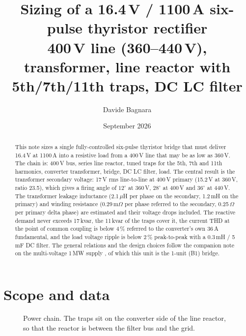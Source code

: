 \documentclass[11pt,a4paper]{article}
\title{Sizing of a 16.4\,V / 1100\,A six-pulse thyristor rectifier\\
\large 400\,V line (360--440\,V), transformer, line reactor with 5th/7th/11th traps, DC LC filter}
\author{Davide Bagnara}
\date{September 2026}
\begin{document}
\maketitle

\begin{abstract}
This note sizes a single fully-controlled six-pulse thyristor bridge that must deliver 16.4\,V at 1100\,A into a resistive load from a 400\,V line that may be as low as 360\,V. The chain is: 400\,V bus, series line reactor, tuned traps for the 5th, 7th and 11th harmonics, converter transformer, bridge, DC LC filter, load. The central result is the transformer secondary voltage: 17\,V rms line-to-line at 400\,V primary (15.2\,V at 360\,V, ratio 23.5), which gives a firing angle of $12^\circ$ at 360\,V, $28^\circ$ at 400\,V and $36^\circ$ at 440\,V. The transformer leakage inductance (2.1\,$\mu$H per phase on the secondary, 1.2\,mH on the primary) and winding resistance (0.29\,m$\Omega$ per phase referred to the secondary, 0.25\,$\Omega$ per primary delta phase) are estimated and their voltage drops included. The reactive demand never exceeds 17\,kvar, the 11\,kvar of the traps cover it, the current THD at the point of common coupling is below 4\,\% referred to the converter's own 36\,A fundamental, and the load voltage ripple is below 2\,\% peak-to-peak with a 0.3\,mH / 5\,mF DC filter. The general relations and the design choices follow the companion note on the multi-voltage 1\,MW supply \cite{acdc}, of which this unit is the 1-unit (B1) bridge.
\end{abstract}

\tableofcontents

\section{Scope and data}

\begin{figure}[h]
\centering
{}
\caption{Power chain. The traps sit on the converter side of the line reactor, so that the reactor is between the filter bus and the grid.}
\label{fig:chain}
\end{figure}
\end{document}
